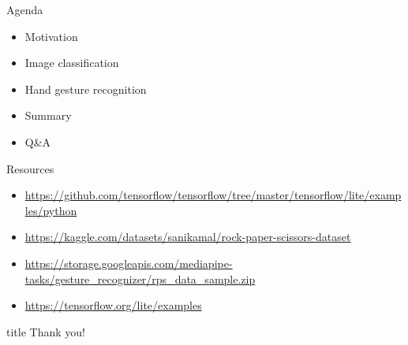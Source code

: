 \documentclass{beamer}
\begin{document}
\begin{frame}{Agenda}
  \begin{itemize}
	\item Motivation
	\item Image classification
	\item Hand gesture recognition
	\item Summary
	\item Q\&A
  \end{itemize}
\end{frame}






\begin{frame}{Resources}
  \begin{itemize}
	\item \url{https://github.com/tensorflow/tensorflow/tree/master/tensorflow/lite/examples/python}
	\item \url{https://kaggle.com/datasets/sanikamal/rock-paper-scissors-dataset}
	\item \url{https://storage.googleapis.com/mediapipe-tasks/gesture_recognizer/rps_data_sample.zip}
	\item \url{https://tensorflow.org/lite/examples}
  \end{itemize}
\end{frame}

\begin{frame}{}
  \vfill
  \centering
  \begin{beamercolorbox}[center]{title}
	Thank you!
  \end{beamercolorbox}
  \vfill
\end{frame}
\end{document}
